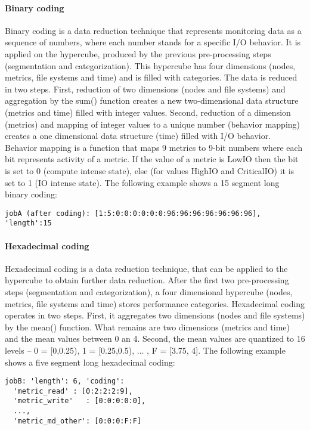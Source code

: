 \documentclass{jhps}
\begin{document}
\paragraph{Binary coding}
Binary coding is a data reduction technique that represents monitoring data as a sequence of numbers, where each number stands for a specific I/O behavior.
It is applied on the hypercube, produced by the previous pre-processing steps (segmentation and categorization).
This hypercube has four dimensions (nodes, metrics, file systems and time) and is filled with categories.
The data is reduced in two steps.
First, reduction of two dimensions (nodes and file systems) and aggregation by the sum() function creates a new two-dimensional data structure (metrics and time) filled with integer values.
Second, reduction of a dimension (metrics) and mapping of integer values to a unique number (behavior mapping) creates a one dimensional data structure (time) filled with I/O behavior.
Behavior mapping is a function that maps 9 metrics to 9-bit numbers where each bit represents activity of a metric.
If the value of a metric is LowIO then the bit is set to 0 (compute intense state), else (for values HighIO and CriticalIO) it is set to 1 (IO intense state).
The following example shows a 15 segment long binary coding:

\begin{lstlisting}
jobA (after coding): [1:5:0:0:0:0:0:0:96:96:96:96:96:96:96], 'length':15
\end{lstlisting}

\paragraph{Hexadecimal coding}
Hexadecimal coding is a data reduction technique, that can be applied to the hypercube to obtain further data reduction.
After the first two pre-processing steps (segmentation and categorization), a four dimensional hypercube (nodes, metrics, file systems and time) stores performance categories.
Hexadecimal coding operates in two steps.
First, it aggregates two dimensions (nodes and file systems) by the mean() function.
What remains are two dimensions (metrics and time) and the mean values between 0 an 4.
Second, the mean values are quantized to 16 levels -- 0 = [0,0.25), 1 = [0.25,0.5), $ \ldots $ , F = [3.75, 4].
The following example shows a five segment long hexadecimal coding:

\begin{lstlisting}
jobB: 'length': 6, 'coding':
  'metric_read'	: [0:2:2:2:9],
  'metric_write'   : [0:0:0:0:0],
  ...,
  'metric_md_other': [0:0:0:F:F]
\end{lstlisting}
\end{document}
